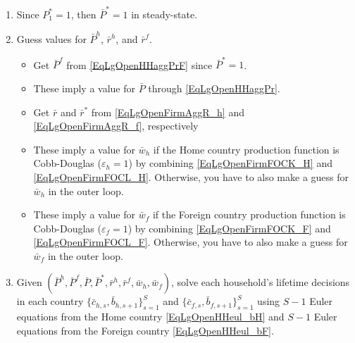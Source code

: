 \documentclass[letterpaper,12pt]{article}
\theoremstyle{definition}
\newcommand\ve{\varepsilon}
\begin{document}
    \begin{enumerate}
      \item Since $P^*_1 = 1$, then $\bar{P}^* = 1$ in steady-state.
      \item Guess values for $\bar{P}^h$, $\bar{r}^h$, and $\bar{r}^f$.
      \begin{itemize}
        \item Get $\bar{P}^f$ from \eqref{EqLgOpenHHaggPrF} since $\bar{P}^* = 1$.
        \item These imply a value for $\bar{P}$ through \eqref{EqLgOpenHHaggPr}.
        \item Get $\bar{r}$ and $\bar{r}^*$ from \eqref{EqLgOpenFirmAggR_h} and \eqref{EqLgOpenFirmAggR_f}, respectively
        \item These imply a value for $\bar{w}_h$ if the Home country production function is Cobb-Douglas ($\ve_h=1$) by combining \eqref{EqLgOpenFirmFOCK_H} and \eqref{EqLgOpenFirmFOCL_H}. Otherwise, you have to also make a guess for $\bar{w}_h$ in the outer loop.
        \item These imply a value for $\bar{w}_f$ if the Foreign country production function is Cobb-Douglas ($\ve_f=1$) by combining \eqref{EqLgOpenFirmFOCK_F} and \eqref{EqLgOpenFirmFOCL_F}. Otherwise, you have to also make a guess for $\bar{w}_f$ in the outer loop.
      \end{itemize}
      \item Given $\left(\bar{P}^h, \bar{P}^f, \bar{P}, \bar{P}^*, \bar{r}^h, \bar{r}^f, \bar{w}_h, \bar{w}_f\right)$, solve each household's lifetime decisions in each country $\{\bar{c}_{h,s},\bar{b}_{h,s+1}\}_{s=1}^S$ and $\{\bar{c}_{f,s},\bar{b}_{f,s+1}\}_{s=1}^S$ using $S-1$ Euler equations from the Home country \eqref{EqLgOpenHHeul_bH} and $S-1$ Euler equations from the Foreign country \eqref{EqLgOpenHHeul_bF}.


\end{enumerate}
\end{document}
